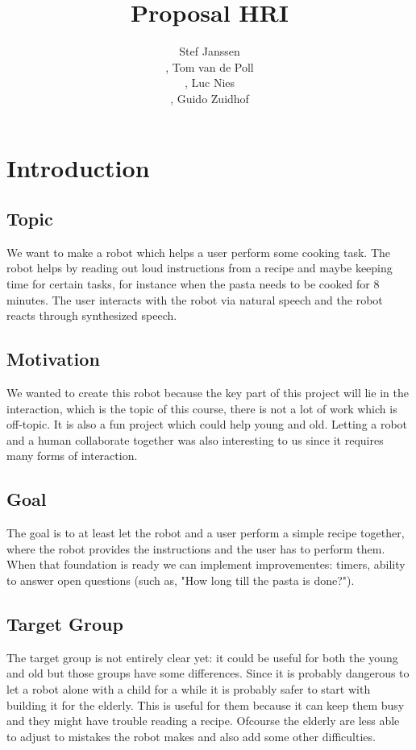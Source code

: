 \documentclass[11pt]{article} %
\title{Proposal HRI }
\author{Stef Janssen\\,
	Tom van de Poll\\,
	Luc Nies\\,
	Guido Zuidhof}
\begin{document}
\maketitle

\section{Introduction}

\subsection{Topic} We want to make a robot which helps a user perform some cooking task. The robot helps by reading out loud instructions from a recipe and maybe keeping time for certain tasks, for instance when the pasta needs to be cooked for 8 minutes. The user interacts with the robot via natural speech and the robot reacts through synthesized speech.

\subsection{Motivation} We wanted to create this robot because the key part of this project will lie in the interaction, which is the topic of this course, there is not a lot of work which is off-topic. It is also a fun project which could help young and old. Letting a robot and a human collaborate together was also interesting to us since it requires many forms of interaction. 

\subsection{Goal} The goal is to at least let the robot and a user perform a simple recipe together, where the robot provides the instructions and the user has to perform them. When that foundation is ready we can implement improvementes: timers, ability to answer open questions (such as, "How long till the pasta is done?").

\subsection{Target Group} The target group is not entirely clear yet: it could be useful for both the young and old but those groups have some differences. Since it is probably dangerous to let a robot alone with a child for a while it is probably safer to start with building it for the elderly. This is useful for them because it can keep them busy and they might have trouble reading a recipe. Ofcourse the elderly are less able to adjust to mistakes the robot makes and also add some other difficulties.
\end{document}
